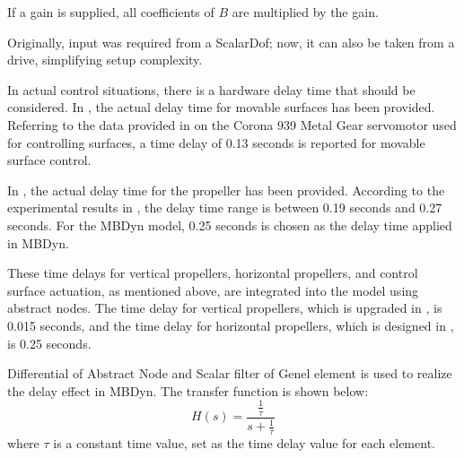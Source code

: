 If a gain is supplied, all coefficients of \( B \) are multiplied by the gain.

Originally, input was required from a ScalarDof; now, it can also be taken from a drive, simplifying setup complexity.

In actual control situations, there is a hardware delay time that should be considered. In \cite{martello2021}, the actual delay time for movable surfaces has been provided. Referring to the data provided in \cite{battaini2020} on the Corona 939 Metal Gear servomotor \cite{CoronaServo} used for controlling surfaces, a time delay of 0.13 seconds is reported for movable surface control.

In \cite{battaini2022}, the actual delay time for the propeller has been provided. According to the experimental results in \cite{martello2021}, the delay time range is between 0.19 seconds and 0.27 seconds. For the MBDyn model, 0.25 seconds is chosen as the delay time applied in MBDyn.

These time delays for vertical propellers, horizontal propellers, and control surface actuation, as mentioned above, are integrated into the model using abstract nodes. The time delay for vertical propellers, which is upgraded in \cite{battaini2022}, is 0.015 seconds, and the time delay for horizontal propellers, which is designed in \cite{martello2021}, is 0.25 seconds.

Differential of Abstract Node and Scalar filter of Genel element is used to realize the delay effect in MBDyn. The transfer function is shown below:
\begin{equation}
    H(s) = \frac{\frac{1}{\tau}}{s+\frac{1}{\tau}}
\end{equation}
where \( \tau \) is a constant time value, set as the time delay value for each element.

